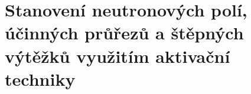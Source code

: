 \section[Měření neutronů aktivační metodou]{Stanovení neutronových polí, účinných průřezů a štěpných výtěžků využitím aktivační techniky}

